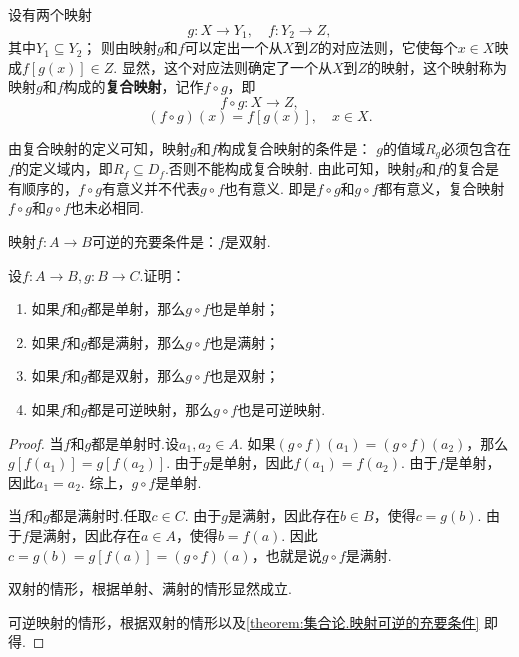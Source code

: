 \begin{definition}
设有两个映射\[
g\colon X \to Y_1, \quad f\colon Y_2 \to Z,
\]其中\(Y_1 \subseteq Y_2\)；
则由映射\(g\)和\(f\)可以定出一个从\(X\)到\(Z\)的对应法则，它使每个\(x \in X\)映成\(f[g(x)] \in Z\).
显然，这个对应法则确定了一个从\(X\)到\(Z\)的映射，这个映射称为映射\(g\)和\(f\)构成的\textbf{复合映射}，记作\(f \circ g\)，即\[
f \circ g: X \to Z,
\]\[
(f \circ g)(x) = f[g(x)], \quad x \in X.
\]

由复合映射的定义可知，映射\(g\)和\(f\)构成复合映射的条件是：
\(g\)的值域\(R_g\)必须包含在\(f\)的定义域内，即\(R_f \subseteq D_f\).否则不能构成复合映射.
由此可知，映射\(g\)和\(f\)的复合是有顺序的，\(f \circ g\)有意义并不代表\(g \circ f\)也有意义.
即是\(f \circ g\)和\(g \circ f\)都有意义，复合映射\(f \circ g\)和\(g \circ f\)也未必相同.
\end{definition}

\begin{theorem}\label{theorem:集合论.映射可逆的充要条件}
映射\(f\colon A \to B\)可逆的充要条件是：\(f\)是双射.
\end{theorem}

\begin{example}
设\(f\colon A \to B, g\colon B \to C\).证明：\begin{enumerate}
\item 如果\(f\)和\(g\)都是单射，那么\(g \circ f\)也是单射；
\item 如果\(f\)和\(g\)都是满射，那么\(g \circ f\)也是满射；
\item 如果\(f\)和\(g\)都是双射，那么\(g \circ f\)也是双射；
\item 如果\(f\)和\(g\)都是可逆映射，那么\(g \circ f\)也是可逆映射.
\end{enumerate}
\begin{proof}
当\(f\)和\(g\)都是单射时.设\(a_1,a_2 \in A\).
如果\((g \circ f)(a_1) = (g \circ f)(a_2)\)，那么\(g[f(a_1)] = g[f(a_2)]\).
由于\(g\)是单射，因此\(f(a_1) = f(a_2)\).
由于\(f\)是单射，因此\(a_1 = a_2\).
综上，\(g \circ f\)是单射.

当\(f\)和\(g\)都是满射时.任取\(c \in C\).
由于\(g\)是满射，因此存在\(b \in B\)，使得\(c = g(b)\).
由于\(f\)是满射，因此存在\(a \in A\)，使得\(b = f(a)\).
因此\(c = g(b) = g[f(a)] = (g \circ f)(a)\)，也就是说\(g \circ f\)是满射.

双射的情形，根据单射、满射的情形显然成立.

可逆映射的情形，根据双射的情形以及\cref{theorem:集合论.映射可逆的充要条件} 即得.
\end{proof}
\end{example}

